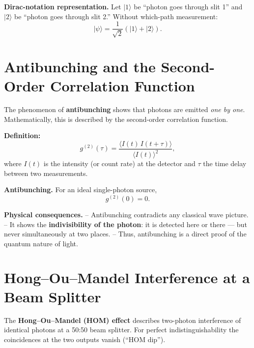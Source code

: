 \textbf{Dirac-notation representation.}  
Let \(|1\rangle\) be “photon goes through slit 1” and \(|2\rangle\) be “photon goes through slit 2.”  
Without which-path measurement:
\[
|\psi\rangle = \frac{1}{\sqrt{2}} \left( |1\rangle + |2\rangle \right).
\]

\section{Antibunching and the Second-Order Correlation Function}
\label{anhangA:antibunching}

The phenomenon of \textbf{antibunching} shows that photons are emitted \emph{one by one}. 
Mathematically, this is described by the second-order correlation function.

\textbf{Definition:}
\[
g^{(2)}(\tau) = \frac{\langle I(t) \, I(t+\tau) \rangle}{\langle I(t) \rangle^2},
\]
where \( I(t) \) is the intensity (or count rate) at the detector and \(\tau\) the time delay between two measurements.

\textbf{Antibunching.}
For an ideal single-photon source,
\[
g^{(2)}(0) = 0.
\]

\textbf{Physical consequences.}
– Antibunching contradicts any classical wave picture.  
– It shows the \textbf{indivisibility of the photon}: it is detected here or there — but never simultaneously at two places.  
– Thus, antibunching is a direct proof of the quantum nature of light.

\section{Hong–Ou–Mandel Interference at a Beam Splitter}
\label{anhangA:HOM}

The \textbf{Hong–Ou–Mandel (HOM) effect} describes two-photon interference of identical photons at a 50:50 beam splitter.
For perfect indistinguishability the coincidences at the two outputs vanish (“HOM dip”).

